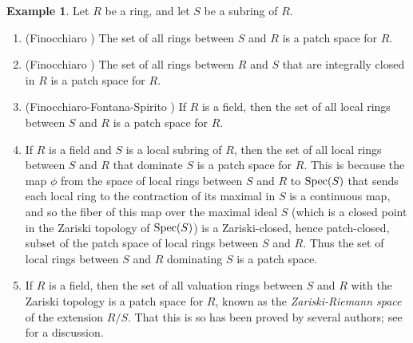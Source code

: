 \documentclass[11pt]{amsart}
\theoremstyle{definition}
\newtheorem{example}[theorem]{Example}
\def\Spec{\mbox{\rm Spec}}
\begin{document}
\begin{example} \label{example: patch spaces}
Let $R$ be a ring, and let $S$ be a subring of $R$. 

\begin{enumerate}[label=\textup{(\arabic{*})}, mode=unboxed]
\item  (Finocchiaro \cite[Proposition~3.5]{Fin}) The set of all rings between $S$ and $R$ is a patch space for $R$.

\item (Finocchiaro \cite[Proposition 3.6]{Fin})  The set of all rings between  $R$ and $S$ that are integrally closed in $R$ is a patch space for $R$. 

\item (Finocchiaro-Fontana-Spirito \cite[Corollary~2.14]{FFS}) If $R$ is a field, then the set of all local rings between $S$ and $R$ is a patch space for $R$.


\item  If $R$ is a field and $S$ is a local subring of $R$, then the set of all local rings between $S$ and $R$ that dominate $S$ is a patch space for $R$. This is because the map $\phi$ from the space of local rings between $S$ and $R$ to $\Spec(S)$ that sends each local ring  to the contraction of its maximal in $S$ is a continuous map, and so the fiber of this map over the maximal ideal $S$ (which is a  closed point in the Zariski topology of $\Spec(S)$) is a Zariski-closed, hence patch-closed, subset of the patch space of local rings between $S$ and $R$. Thus the set of local rings between $S$ and $R$ dominating $S$ is a patch space. 

\item If $R$ is a field, then the set of all valuation rings between $S$ and $R$ with the Zariski topology is a patch space for $R$, known as the  {\it Zariski-Riemann space} of the extension $R/S$. That this is so has been proved by several authors; see \cite[Example 2.2(8)]{OIrr} for a discussion.  


\end{enumerate}
\end{example}
\end{document}
